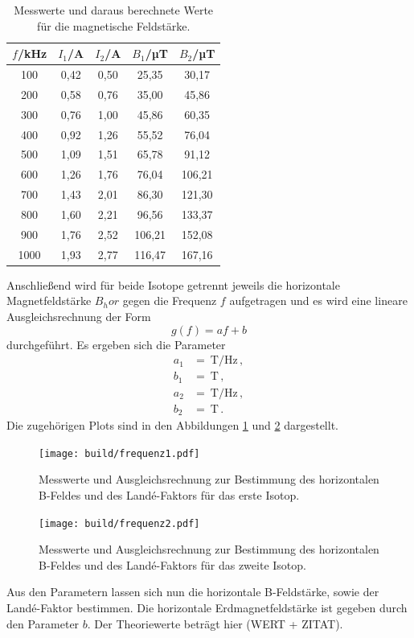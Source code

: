 \begin{table}[htp]
	\begin{center}
    \caption{Messwerte und daraus berechnete Werte für die magnetische Feldstärke.}
    \label{tab:werte}
		\begin{tabular}{ccccc}
		\toprule
			{$f$/kHz} & {$I_1$/A} & {$I_2$/A} & {$B_1$/µT} & {$B_2$/µT}\\
			\midrule
			100 & 0,42 & 0,50 & 25,35 & 30,17\\
			200 & 0,58 & 0,76 & 35,00 & 45,86\\
			300 & 0,76 & 1,00 & 45,86 & 60,35\\
			400 & 0,92 & 1,26 & 55,52 & 76,04\\
			500 & 1,09 & 1,51 & 65,78 & 91,12\\
			600 & 1,26 & 1,76 & 76,04 & 106,21\\
			700 & 1,43 & 2,01 & 86,30 & 121,30\\
			800 & 1,60 & 2,21 & 96,56 & 133,37\\
			900 & 1,76 & 2,52 & 106,21 & 152,08\\
			1000 & 1,93 & 2,77 & 116,47 & 167,16\\
		\bottomrule
		\end{tabular}
	\end{center}
\end{table}

Anschließend wird für beide Isotope getrennt jeweils die horizontale Magnetfeldstärke $B_hor$
gegen die Frequenz $f$ aufgetragen und es wird eine lineare Ausgleichsrechnung der Form
\begin{equation*}
  g(f)=af+b
\end{equation*}
durchgeführt. Es ergeben sich die Parameter
\begin{align*}
 a_1&= \SI{}{\tesla\per\Hz}  \,,\\
 b_1&= \SI{}{\tesla} \,,\\
 a_2&= \SI{}{\tesla\per\Hz} \,,\\
 b_2&= \SI{}{\tesla} \,.
\end{align*}
Die zugehörigen Plots sind in den Abbildungen \ref{fig:frequenz1} und \ref{fig:frequenz2} dargestellt.
\begin{figure}
  \centering
  \texttt{[image: build/frequenz1.pdf]}
  \caption{Messwerte und Ausgleichsrechnung zur Bestimmung des horizontalen B-Feldes und des Landé-Faktors für
  das erste Isotop.}
  \label{fig:frequenz1}
\end{figure}
\begin{figure}
  \centering
  \texttt{[image: build/frequenz2.pdf]}
  \caption{Messwerte und Ausgleichsrechnung zur Bestimmung des horizontalen B-Feldes und des Landé-Faktors für
  das zweite Isotop.}
  \label{fig:frequenz2}
\end{figure}
Aus den Parametern lassen sich nun die horizontale B-Feldstärke, sowie der Landé-Faktor bestimmen.
Die horizontale Erdmagnetfeldstärke ist gegeben durch den Parameter $b$. Der Theoriewerte beträgt hier
(WERT + ZITAT).

